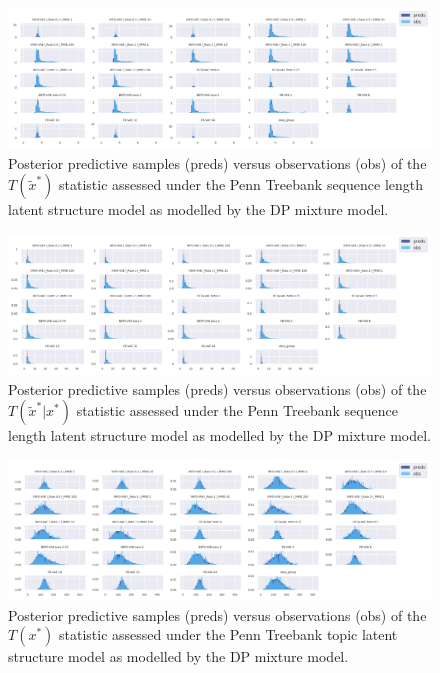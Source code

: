 \begin{figure}[!htb]
    \centering
    \includegraphics[width=\textwidth]{images/bda_checks/surprisal_dps/ptb_seq_len_prediction_checks__unconditional_conditional.png}
    \caption{Posterior predictive samples (preds) versus observations (obs) of the $T(\tilde x^*)$ statistic assessed under the Penn Treebank sequence length latent structure model as modelled by the DP mixture model.}
    \label{fig:surprisal_check_ptb_seq_len_uncon_con}
\end{figure}

\begin{figure}[!htb]
    \centering
    \includegraphics[width=\textwidth]{images/bda_checks/surprisal_dps/ptb_seq_len_prediction_checks__conditional_conditional.png}
    \caption{Posterior predictive samples (preds) versus observations (obs) of the $T(\tilde x^*|x^*)$ statistic assessed under the Penn Treebank sequence length latent structure model as modelled by the DP mixture model.}
    \label{fig:surprisal_check_ptb_seq_len_con_con}
\end{figure}

\begin{figure}[!htb]
    \centering
    \includegraphics[width=\textwidth]{images/bda_checks/surprisal_dps/ptb_topics_prediction_checks__unconditional_unconditional.png}
    \caption{Posterior predictive samples (preds) versus observations (obs) of the $T(x^*)$ statistic assessed under the Penn Treebank topic latent structure model as modelled by the DP mixture model.}
    \label{fig:surprisal_check_ptb_topics_uncon_uncon}
\end{figure}


